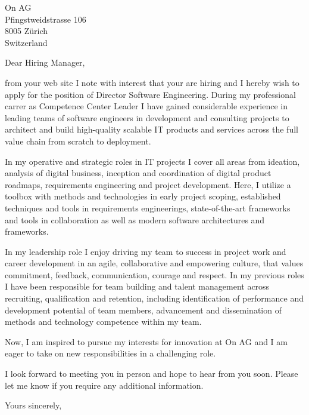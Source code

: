 \documentclass[10pt,a4paper]{dinbrief}
\date{\today}
\begin{document}
 
\begin{letter}  
{%
	On AG\\
	Pfingstweidstrasse 106\\
	8005 Zürich\\
	Switzerland
}
\subject{\bf Job Application Director Software Engineering}
\opening{Dear Hiring Manager,}

from your web site I note with interest that your are  hiring and I hereby wish to apply for the position of Director Software Engineering. During my professional carrer as Competence Center Leader I have gained considerable experience in leading teams of software engineers in development and consulting projects to architect and build high-quality scalable IT products and services across the full value chain from scratch to deployment.

In my operative and strategic roles in IT projects I cover all areas from ideation, analysis of digital business, inception and coordination of digital product roadmaps, requirements engineering and project development. Here, I utilize a toolbox with methods and technologies in early project scoping, established techniques and tools in requirements engineerings, state-of-the-art frameworks and tools in collaboration as well as modern software architectures and frameworks.

In my leadership role I enjoy driving my team to success in project work and career development in an agile, collaborative and empowering culture, that values commitment, feedback, communication, courage and respect. In my previous roles I have been responsible for team building and talent management across recruiting, qualification and retention, including identification of performance and development potential of team members, advancement and dissemination of methods and technology competence within my team.

Now, I am inspired to pursue my interests for innovation at On AG and I am eager to take on new responsibilities in a challenging role.

I look forward to meeting you in person and hope to hear from you soon. Please let me know if you require any additional information.

\closing{Yours sincerely,}
\end{letter}
\end{document}
